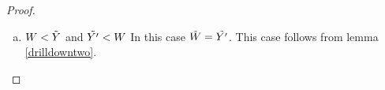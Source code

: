 \documentclass[10pt,a4paper]{scrartcl}
\begin{document}
\begin{proof}
\begin{enumerate}[(i)]
\begin{enumerate} [(a)]
\begin{center}
[.40]
\end{center}
\noindent
Latest thinking: We definitely need to remove the $B_{j_i}$ from this diagram -- they are not implied bu the inductive hypothesis. 
\noindent Questions: Should we remove $A_i$ from the above diagram? Do we use the $a_i$  at all? Do we need to? Are they there as harmless implied dependencies.
\noindent
Define $g: D \morph Y$ and $g': D \morph Y'$. Then we can easily show that
\begin{equation}
g \circ \pbase{D}{Y}{W} = g \circ \pbase{D}{Y}{W}
\end{equation}
    
\item $W < \tilde{Y}$ and $\tilde{Y'} < W$
In this case $\tilde{W} = \tilde{Y'}$.
This case follows from lemma \ref{drilldowntwo}.



\end{enumerate}
\end{enumerate}
\end{proof}
\end{document}

